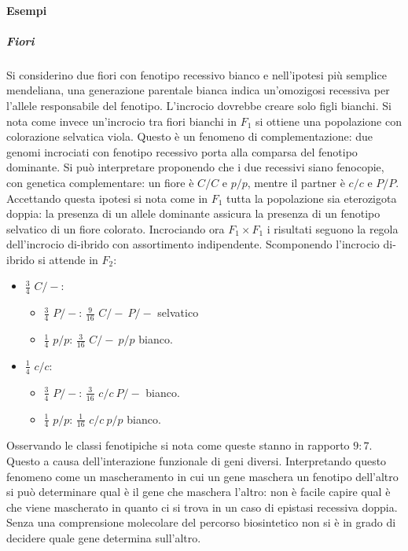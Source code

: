 \paragraph{Esempi}
\subparagraph{Fiori}
Si considerino due fiori con fenotipo recessivo bianco e nell'ipotesi pi\`u semplice mendeliana, una generazione parentale bianca indica un'omozigosi recessiva per l'allele responsabile
del fenotipo. L'incrocio dovrebbe creare solo figli bianchi. Si nota come invece un'incrocio tra fiori bianchi in $F_1$ si ottiene una popolazione con colorazione selvatica viola. 
Questo \`e un fenomeno di complementazione: due genomi incrociati con fenotipo recessivo porta alla comparsa del fenotipo dominante. Si pu\`o interpretare proponendo che i due recessivi
siano fenocopie, con genetica complementare: un fiore \`e $C/C$ e $p/p$, mentre il partner \`e $c/c$ e $P/P$. Accettando questa ipotesi si nota come in $F_1$ tutta la popolazione
sia eterozigota doppia: la presenza di un allele dominante assicura la presenza di un fenotipo selvatico di un fiore colorato. Incrociando ora $F_1\times F_1$ i risultati seguono la
regola dell'incrocio di-ibrido con assortimento indipendente. Scomponendo l'incrocio di-ibrido si attende in $F_2$:
\begin{itemize}
	\item $\frac{3}{4}$ $C/-$:
		\begin{itemize}
			\item $\frac{3}{4}$ $P/-$: $\frac{9}{16}$ $C/-\ P/-$ selvatico
			\item $\frac{1}{4}$ $p/p$: $\frac{3}{16}$ $C/-\ p/p$ bianco.
		\end{itemize}
	\item $\frac{1}{4}$ $c/c$:
		\begin{itemize}
			\item $\frac{3}{4}$ $P/-$: $\frac{3}{16}$ $c/c\ P/-$ bianco.
			\item $\frac{1}{4}$ $p/p$: $\frac{1}{16}$ $c/c\ p/p$ bianco.
		\end{itemize}
\end{itemize}
Osservando le classi fenotipiche si nota come queste stanno in rapporto $9:7$. Questo a causa dell'interazione funzionale di geni diversi. Interpretando questo fenomeno come un 
mascheramento in cui un gene maschera un fenotipo dell'altro si pu\`o determinare qual \`e il gene che maschera l'altro: non \`e facile capire qual \`e che viene mascherato in quanto 
ci si trova in un caso di epistasi recessiva doppia. Senza una comprensione molecolare del percorso biosintetico non si \`e in grado di decidere quale gene determina sull'altro. \\
